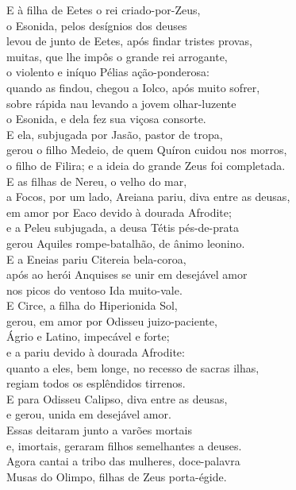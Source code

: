 \begin{pages}
\begin{Rightside}
\quad{}E à filha de Eetes o rei criado-por-Zeus,\\
o Esonida, pelos desígnios dos deuses \\
levou de junto de Eetes, após findar tristes provas,\\
muitas, que lhe impôs o grande rei arrogante, \\
o violento e iníquo Pélias ação-ponderosa:\\
quando as findou, chegou a Iolco, após muito sofrer,\\
sobre rápida nau levando a jovem olhar-luzente\\
o Esonida, e dela fez sua viçosa consorte.\\
E ela, subjugada por Jasão, pastor de tropa, \\
gerou o filho Medeio, de quem Quíron cuidou nos morros,\\
o filho de Filira; e a ideia do grande Zeus foi completada.\\

\quad{}E as filhas de Nereu, o velho do mar,\\
a Focos, por um lado, Areiana pariu, diva entre as deusas,\\
em amor por Eaco devido à dourada Afrodite; \\
e a Peleu subjugada, a deusa Tétis pés-de-prata\\
gerou Aquiles rompe-batalhão, de ânimo leonino.\\

\quad{}E a Eneias pariu Citereia bela-coroa,\\
após ao herói Anquises se unir em desejável amor\\
nos picos do ventoso Ida muito-vale. \\

\quad{}E Circe, a filha do Hiperionida Sol,\\
gerou, em amor por Odisseu juizo-paciente,\\
Ágrio e Latino, impecável e forte;\\
e a  pariu devido à dourada Afrodite:\\
quanto a eles, bem longe, no recesso de sacras ilhas, \\
regiam todos os esplêndidos tirrenos.\\

\quad{}E  para Odisseu Calipso, diva entre as deusas,\\
e  gerou, unida em desejável amor.\\

\quad{}Essas deitaram junto a varões mortais\\
e, imortais, geraram filhos semelhantes a deuses. \\
Agora cantai a tribo das mulheres, doce-palavra\\
Musas do Olimpo, filhas de Zeus porta-égide.            
            \pend
         \endnumbering
    \end{Rightside}
\end{pages}
\Pages